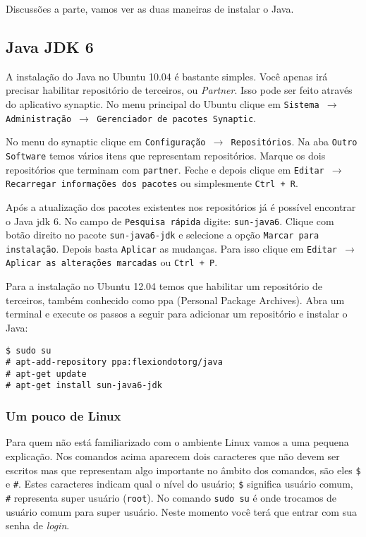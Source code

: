 Discussões a parte, vamos ver as duas maneiras de instalar o Java.

\subsection{Java JDK 6}

A instalação do Java no Ubuntu 10.04 é bastante simples. Você apenas irá precisar habilitar repositório
de terceiros, ou \textit{Partner}. Isso pode ser feito através do aplicativo \gls{synaptic}. No menu
principal do Ubuntu clique em \texttt{Sistema $\rightarrow$ Administração $\rightarrow$ Gerenciador de pacotes
Synaptic}.

No menu do \gls{synaptic} clique em \texttt{Configuração $\rightarrow$ Repositórios}. Na aba \texttt{Outro Software}
temos vários itens que representam repositórios. Marque os dois repositórios que terminam com \texttt{partner}.
Feche e depois clique em \texttt{Editar $\rightarrow$ Recarregar informações dos pacotes} ou simplesmente
\texttt{Ctrl + R}.

Após a atualização dos pacotes existentes nos repositórios já é possível encontrar o Java \gls{jdk} 6.
No campo de \texttt{Pesquisa rápida} digite: \texttt{sun-java6}. Clique com botão direito no pacote
\texttt{sun-java6-jdk} e selecione a opção \texttt{Marcar para instalação}. Depois basta \texttt{Aplicar}
as mudanças. Para isso clique em \texttt{Editar $\rightarrow$ Aplicar as alterações marcadas} ou \texttt{Ctrl + P}.

\bigskip

Para a instalação no Ubuntu 12.04 temos que habilitar um repositório de terceiros, também conhecido como
\gls{ppa} (Personal Package Archives). Abra um terminal e execute os passos a seguir para adicionar um
repositório e instalar o Java:

\begin{flushleft}\texttt{\$ sudo su\\
\# apt-add-repository ppa:flexiondotorg/java\\
\# apt-get update\\
\# apt-get install sun-java6-jdk\\}
\end{flushleft}

\subsubsection{Um pouco de Linux}

Para quem não está familiarizado com o ambiente Linux vamos a uma pequena explicação. Nos comandos
acima aparecem dois caracteres que não devem ser escritos mas que representam algo importante no âmbito
dos comandos, são eles \texttt{\$} e \texttt{\#}. Estes caracteres indicam qual o nível do usuário;
\texttt{\$} significa usuário comum, \texttt{\#} representa super usuário (\texttt{root}). No comando
\texttt{sudo su} é onde trocamos de usuário comum para super usuário. Neste momento você terá que entrar
com sua senha de \textit{login}.

